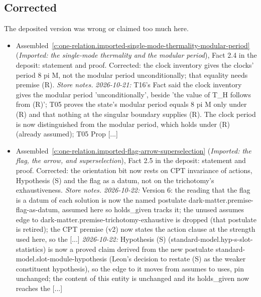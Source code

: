 \documentclass[11pt]{article}
\theoremstyle{definition}
\theoremstyle{plain}
\begin{document}
\subsection*{Corrected}
The deposited version was wrong or claimed too much here.
\begin{itemize}\setlength{\itemsep}{2pt}
\item Assembled~\ref{c:one-relation.imported-single-mode-thermality-modular-period} (\emph{Imported: the single-mode thermality and the modular period}), Fact 2.4 in the deposit: statement and proof. Corrected: the clock inventory gives the clocks' period 8 pi M, not the modular period unconditionally; that equality needs premise (R). \emph{Store notes.} \emph{2026-10-21:} T16's Fact said the clock inventory gives the modular period 'unconditionally', beside 'the value of T\_H follows from (R)'; T05 proves the state's modular period equals 8 pi M only under (R) and that nothing at the singular boundary supplies (R). The clock period is now distinguished from the modular period, which holds under (R) (already assumed); T05 Prop [...]
\item Assembled~\ref{c:one-relation.imported-flag-arrow-superselection} (\emph{Imported: the flag, the arrow, and superselection}), Fact 2.5 in the deposit: statement and proof. Corrected: the orientation bit now rests on CPT invariance of actions, Hypothesis (S) and the flag as a datum, not on the trichotomy's exhaustiveness. \emph{Store notes.} \emph{2026-10-22:} Version 6: the reading that the flag is a datum of each solution is now the named postulate dark-matter.premise-flag-as-datum, assumed here so holds\_given tracks it; the unused assumes edge to dark-matter.premise-trichotomy-exhaustive is dropped (that postulate is retired); the CPT premise (v2) now states the action clause at the strength used here, so the [...] \emph{2026-10-22:} Hypothesis (S) (standard-model.hyp-s-slot-statistics) is now a proved claim derived from the new postulate standard-model.slot-module-hypothesis (Leon's decision to restate (S) as the weaker constituent hypothesis), so the edge to it moves from assumes to uses, pin unchanged; the content of this entity is unchanged and its holds\_given now reaches the [...]

\end{itemize}
\end{document}
